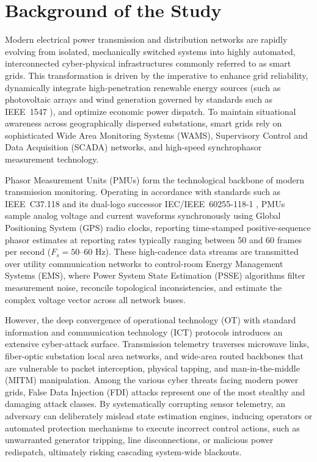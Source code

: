 \documentclass[12pt,a4paper]{report}
\begin{document}
\section{Background of the Study}
Modern electrical power transmission and distribution networks are rapidly
evolving from isolated, mechanically switched systems into highly automated,
interconnected cyber-physical infrastructures commonly referred to as smart
grids. This transformation is driven by the imperative to enhance grid
reliability, dynamically integrate high-penetration renewable energy sources
(such as photovoltaic arrays and wind generation governed by standards such as IEEE~1547 \cite{ieee1547}), and optimize economic power
dispatch. To maintain situational awareness across geographically dispersed
substations, smart grids rely on sophisticated Wide Area Monitoring Systems
(WAMS), Supervisory Control and Data Acquisition (SCADA) networks, and
high-speed synchrophasor measurement technology.

Phasor Measurement Units (PMUs) form the technological backbone of modern
transmission monitoring. Operating in accordance with standards such as
IEEE~C37.118 and its dual-logo successor IEC/IEEE~60255-118-1 \cite{ieeeC37118,iec60255},
PMUs sample analog voltage and current waveforms synchronously using Global
Positioning System (GPS) radio clocks, reporting time-stamped positive-sequence
phasor estimates at reporting rates typically ranging between 50 and 60 frames
per second ($F_s = 50\text{--}60\text{ Hz}$). These high-cadence data streams
are transmitted over utility communication networks to control-room Energy
Management Systems (EMS), where Power System State Estimation (PSSE) algorithms
filter measurement noise, reconcile topological inconsistencies, and estimate
the complex voltage vector across all network buses.

However, the deep convergence of operational technology (OT) with standard
information and communication technology (ICT) protocols introduces an extensive
cyber-attack surface. Transmission telemetry traverses microwave links, fiber-optic
substation local area networks, and wide-area routed backbones that are vulnerable
to packet interception, physical tapping, and man-in-the-middle (MITM) manipulation.
Among the various cyber threats facing modern power grids, False Data Injection
(FDI) attacks represent one of the most stealthy and damaging attack classes.
By systematically corrupting sensor telemetry, an adversary can deliberately
mislead state estimation engines, inducing operators or automated protection
mechanisms to execute incorrect control actions, such as unwarranted generator
tripping, line disconnections, or malicious power redispatch, ultimately risking
cascading system-wide blackouts.
\end{document}
